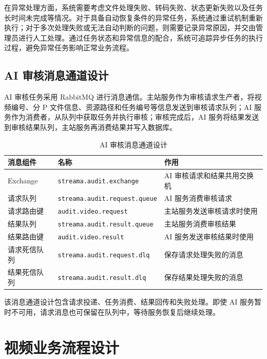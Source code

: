 在异常处理方面，系统需要考虑文件处理失败、转码失败、状态更新失败以及任务长时间未完成等情况。对于具备自动恢复条件的异常任务，系统通过重试机制重新执行；对于多次处理失败或无法自动判断的问题，则需要记录异常原因，并交由管理员进行人工处理。通过任务状态和异常信息的配合，系统可追踪异步任务的执行过程，避免异常任务影响正常业务流程。

\subsection{AI 审核消息通道设计}
\label{subsec:ai-message-channel-design}

AI 审核任务采用 RabbitMQ 进行消息通信。主站服务作为审核请求生产者，将视频编号、分 P 文件信息、资源路径和任务编号等信息发送到审核请求队列；AI 服务作为消费者，从队列中获取任务并执行审核；审核完成后，AI 服务将结果发送到审核结果队列，主站服务再消费结果并写入数据库。

\begin{table}[htbp]
    \centering
    \caption{AI 审核消息通道设计}
    \label{tab:ai-message-channel}
    \begin{tabular}{p{}p{}p{}}
    \hline
    \textbf{消息组件} & \textbf{名称} & \textbf{作用} \\
    \hline
    Exchange & \texttt{streama.audit.exchange} & AI 审核请求和结果共用交换机 \\
    请求队列 & \texttt{streama.audit.request.queue} & AI 服务消费审核请求 \\
    请求路由键 & \texttt{audit.video.request} & 主站服务发送审核请求时使用 \\
    结果队列 & \texttt{streama.audit.result.queue} & 主站服务消费审核结果 \\
    结果路由键 & \texttt{audit.video.result} & AI 服务发送审核结果时使用 \\
    请求死信队列 & \texttt{streama.audit.request.dlq} & 保存请求处理失败的消息 \\
    结果死信队列 & \texttt{streama.audit.result.dlq} & 保存结果处理失败的消息 \\
    \hline
    \end{tabular}
\end{table}

该消息通道设计包含请求投递、任务消费、结果回传和失败处理。即使 AI 服务暂时不可用，请求消息也可保留在队列中，等待服务恢复后继续处理。

\section{视频业务流程设计}

